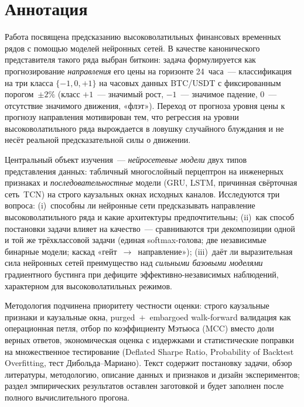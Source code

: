 \documentclass[12pt,a4paper]{report}
\begin{document}
\chapter*{Аннотация}

Работа посвящена предсказанию высоковолатильных финансовых временных рядов с
помощью моделей нейронных сетей. В качестве канонического представителя такого
ряда выбран биткоин: задача формулируется как прогнозирование \emph{направления}
его цены на горизонте 24~часа~--- классификация на три класса $\{-1,0,+1\}$ на
часовых данных BTC/USDT с фиксированным порогом~$\pm 2\%$ (класс $+1$~--- значимый
рост, $-1$~--- значимое падение, $0$~--- отсутствие значимого движения, «флэт»).
Переход от прогноза уровня цены к прогнозу направления мотивирован тем, что
регрессия на уровни высоковолатильного ряда вырождается в ловушку случайного
блуждания и не несёт реальной предсказательной силы о движении.

Центральный объект изучения~--- \emph{нейросетевые модели} двух типов
представления данных: табличный многослойный перцептрон на инженерных признаках и
\emph{последовательностные} модели (GRU, LSTM, причинная свёрточная сеть~TCN) на
строго каузальных окнах исходных каналов. Исследуются три вопроса: (i)~способны ли
нейронные сети предсказывать направление высоковолатильного ряда и какие
архитектуры предпочтительны; (ii)~как способ постановки задачи влияет на
качество~--- сравниваются три декомпозиции одной и той же трёхклассовой задачи
(единая softmax-голова; две независимые бинарные модели; каскад
«гейт~$\to$~направление»); (iii)~даёт ли выразительная сила нейронных сетей
преимущество над \emph{сильными базовыми моделями} градиентного бустинга при
дефиците эффективно-независимых наблюдений, характерном для высоковолатильных
режимов.

Методология подчинена приоритету честности оценки: строго каузальные признаки и
каузальные окна, \mbox{purged}~$+$~embargoed walk-forward валидация как операционная
петля, отбор по коэффициенту Мэтьюса (MCC) вместо доли верных ответов,
экономическая оценка с издержками и статистические поправки на множественное
тестирование (Deflated Sharpe Ratio, Probability of Backtest Overfitting, тест
Дибольда--Мариано). Текст содержит постановку задачи, обзор литературы,
методологию, описание данных и признаков и дизайн экспериментов; раздел
эмпирических результатов оставлен заготовкой и будет заполнен после полного
вычислительного прогона.
\end{document}
